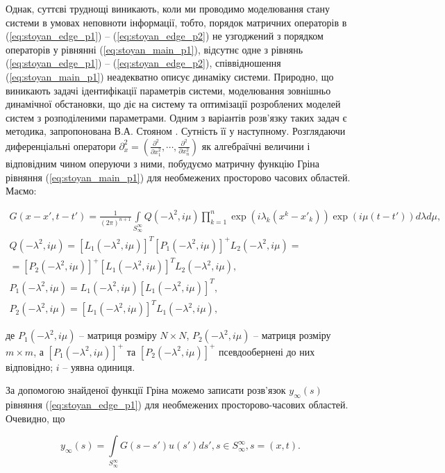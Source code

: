 Однак, суттєві труднощі виникають, коли ми проводимо моделювання стану системи в умовах неповноти інформації,
тобто, порядок матричних операторів в (\ref{eq:stoyan_edge_p1}) – (\ref{eq:stoyan_edge_p2})
не узгоджений з порядком операторів у рівнянні (\ref{eq:stoyan_main_p1}),
відсутнє одне з рівнянь (\ref{eq:stoyan_edge_p1}) – (\ref{eq:stoyan_edge_p2}),
співвідношення (\ref{eq:stoyan_main_p1}) неадекватно описує динаміку системи.
Природно, що виникають задачі ідентифікації параметрів системи, моделювання зовнішньо динамічної обстановки,
що діє на систему та оптимізації розроблених моделей систем з розподіленими параметрами. Одним з варіантів
розв’язку таких задач є методика, запропонована В.А. Стояном
\cite{Stoyan-Modeliuvannia, Stoyan-OZadache, Stoyan-ObOpimizatsii}. Сутність її у наступному.
Розглядаючи диференціальні оператори
$\partial_x^2 = \left(\frac{\partial^2}{\partial x_1^2}, \cdots, \frac{\partial^2}{\partial x_n^2}\right)$
як алгебраїчні величини і відповідним чином оперуючи з ними,
побудуємо матричну функцію Гріна рівняння (\ref{eq:stoyan_main_p1})
для необмежених просторово часових областей. Маємо:

\begin{gather*}
G(x-x', t-t') = \frac{1}{(2\pi)^{n+1}}\int\limits_{S_\infty^\infty}Q(-\lambda^2, i\mu)\prod_{k=1}^n\exp
(i\lambda_k(x^k - x'_k))\exp(i\mu(t-t'))d\lambda d\mu,\\
Q(-\lambda^2, i\mu)=[L_1(-\lambda^2, i\mu)]^T[P_1(-\lambda^2, i\mu)]^{+}L_2(-\lambda^2, i\mu) = \\
=[P_2(-\lambda^2, i\mu)]^{+}[L_1(-\lambda^2, i\mu)]^T L_2(-\lambda^2, i\mu), \\
P_1(-\lambda^2, i\mu) = L_1(-\lambda^2, i\mu)[L_1(-\lambda^2, i\mu)]^T, \\
P_2(-\lambda^2, i\mu) = [L_1(-\lambda^2, i\mu)]^T L_1(-\lambda^2, i\mu),
\end{gather*}

де $P_1(-\lambda^2, i\mu)$ – матриця розміру $N\times N$, $P_2(-\lambda^2, i\mu)$ – матриця
розміру $m \times m$,  а $[P_1(-\lambda^2, i\mu)]^{+}$ та $[P_2(-\lambda^2, i\mu)]^{+}$ псевдообернені
\cite{Gantmaher-Teoriya} до них відповідно; $i$ – уявна одиниця.

За допомогою знайденої функції Гріна можемо записати розв’язок
$y_\infty(s)$ рівняння (\ref{eq:stoyan_edge_p1}) для необмежених
просторово-часових областей. Очевидно, що

\begin{equation}
\label{eq:stoyan_sol_infnty}
y_\infty(s)=\int\limits_{S_\infty^\infty}G(s-s')u(s')ds', s \in S_\infty^\infty, s=(x,t).
\end{equation}

